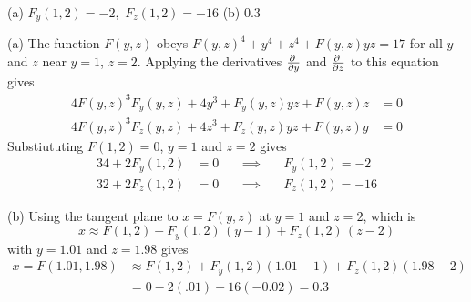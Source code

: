 %

\begin{answer}
(a) $F_y(1,2)=-2$,\ $F_z(1,2)=-16$\qquad
(b) $0.3$
\end{answer}

\begin{solution}
(a) The function $F(y,z)$ obeys $F(y,z)^4+y^4+z^4+F(y,z)yz=17$ for all $y$ and $z$ near $y=1$, $z=2$.
Applying the derivatives $\pdiff{}{y}$ and $\pdiff{}{z}$ 
to this equation gives
\begin{align*}
4F(y,z)^3F_y(y,z)+4y^3+F_y(y,z)yz +F(y,z)z&=0 \\
4F(y,z)^3F_z(y,z)+4z^3+F_z(y,z)yz +F(y,z)y&=0
\end{align*}
Substiututing $F(1,2)=0$, $y=1$ and $z=2$ gives
\begin{alignat*}{3}
4+2F_y(1,2)&=0 & &\ \implies\  & &F_y(1,2)=-2 \\
32+2F_z(1,2)&=0 & &\ \implies\  & & F_z(1,2)=-16
\end{alignat*}

(b) Using the tangent plane to $x=F(y,z)$ at $y=1$ and $z=2$, which is
\begin{equation*}
x \approx F(1,2) +F_y(1,2)\,(y-1) +F_z(1,2)\,(z-2)
\end{equation*}
with $y=1.01$ and $z=1.98$ gives
\begin{align*}
x=F(1.01, 1.98)
&\approx F(1,2)+F_y(1,2)(1.01-1)+F_z(1,2)(1.98-2) \\
&=0-2(.01)-16(-0.02)
=0.3
\end{align*}
\end{solution}








